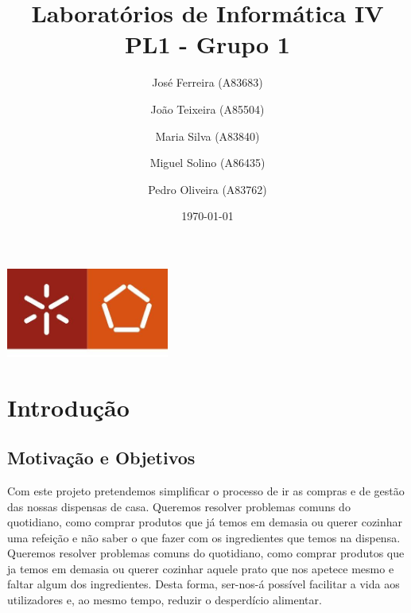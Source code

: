 \documentclass[a4paper]{report}
\begin{document}
\title{Laboratórios de Informática IV\\
\large PL1 - Grupo 1}
\author{José Ferreira (A83683) \and João Teixeira (A85504) \and Maria Silva (A83840) \and Miguel Solino (A86435) \and Pedro Oliveira (A83762)}
\date{\today}

\begin{center}
    \begin{minipage}{0.75\linewidth}
        \centering
        \includegraphics[width=0.4\textwidth]{images/eng.jpeg}\par\vspace{1cm}
        \vspace{1.5cm}
        \href{https://www.uminho.pt/PT}
        {\color{black}{\scshape\LARGE Universidade do Minho}} \par
        \vspace{1cm}
        \href{https://www.di.uminho.pt/}
        {\color{black}{\scshape\Large Departamento de Informática}} \par
        \vspace{1.5cm}
        \maketitle
    \end{minipage}
\end{center}


\tableofcontents

\chapter{Introdução}
    \section{Motivação e Objetivos}
    Com este projeto pretendemos simplificar o processo de ir as compras e de
    gestão das nossas dispensas de casa. Queremos resolver problemas comuns do
    quotidiano, como comprar produtos que já temos em demasia ou querer cozinhar
    uma refeição e não saber o que fazer com os ingredientes que temos na
    dispensa.\\
    Queremos resolver problemas comuns do quotidiano, como comprar produtos que 
    ja temos em demasia ou querer cozinhar aquele prato que nos apetece mesmo e
    faltar algum dos ingredientes. Desta forma, ser-nos-á possível facilitar a
    vida aos utilizadores e, ao mesmo tempo, reduzir o desperdício alimentar.
\end{document}
